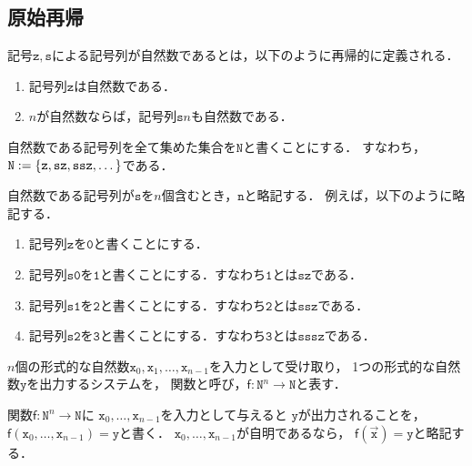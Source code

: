 \subsection{原始再帰}

\newcommand{\syn}[1]{\mathtt{#1}}
\newcommand{\synZ}{\syn{z}}
\newcommand{\synS}{\syn{s}}
\newcommand{\synNat}{\syn{N}}


\begin{myDefinition}[形式的な自然数]
  記号$\synZ,\synS$による記号列が自然数であるとは，以下のように再帰的に定義される．
  \begin{enumerate}
    \item 記号列$\synZ$は自然数である．
    \item $n$が自然数ならば，記号列$\synS n$も自然数である．
  \end{enumerate}
\end{myDefinition}

\begin{myDefinition}[形式的な自然数の全ての集合]
  自然数である記号列を全て集めた集合を$\synNat$と書くことにする．
  すなわち，$\synNat \defeq \{ \synZ, \synS\synZ, \synS\synS\synZ,\dots\}$である．
\end{myDefinition}

\begin{myDefinition}[形式的な自然数の略記]
  自然数である記号列が$\synS$を$n$個含むとき，$\syn{n}$と略記する．
  例えば，以下のように略記する．
  \begin{enumerate}
    \item 記号列$\synZ$を$\syn{0}$と書くことにする．
    \item 記号列$\synS \syn{0}$を$\syn{1}$と書くことにする．すなわち$\syn{1}$とは$\synS \synZ$である．
    \item 記号列$\synS \syn{1}$を$\syn{2}$と書くことにする．すなわち$\syn{2}$とは$\synS \synS \synZ$である．
    \item 記号列$\synS \syn{2}$を$\syn{3}$と書くことにする．すなわち$\syn{3}$とは$\synS \synS \synS \synZ$である．
  \end{enumerate}
\end{myDefinition}

\newcommand{\cfun}[1]{\mathsf{#1}}
\begin{myDefinition}[関数]
  $n$個の形式的な自然数$\syn{x}_0,\syn{x}_1,\dots,\syn{x}_{n-1}$を入力として受け取り，
  1つの形式的な自然数$\syn{y}$を出力するシステムを，
  関数と呼び，$\cfun{f}:\synNat^n \to \synNat$と表す．

  関数$\cfun{f}:\synNat^n \to \synNat$に
  $\syn{x}_0,\dots,\syn{x}_{n-1}$を入力として与えると
  $\syn{y}$が出力されることを，
  $\cfun{f}(\syn{x}_0,\dots,\syn{x}_{n-1}) = \syn{y}$と書く．
  $\syn{x}_0,\dots,\syn{x}_{n-1}$が自明であるなら，
  $\cfun{f}(\vec{\syn{x}}) = \syn{y}$と略記する．
\end{myDefinition}

